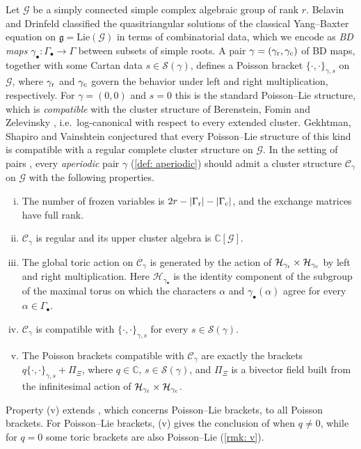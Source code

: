\documentclass[a4paper]{amsart}
\numberwithin{equation}{section}
\theoremstyle{definition}
\theoremstyle{remark}
\newcommand{\bbC}{\mathbb{C}}
\newcommand{\mfg}{\mathfrak{g}}
\newcommand{\mcG}{\mathcal{G}}
\newcommand{\mcH}{\mathcal{H}}
\newcommand{\mcC}{\mathcal{C}}
\newcommand{\mcS}{\mathcal{S}}
\newcommand{\rr}{{\rm r}}
\newcommand{\cc}{{\rm c}}
\newcommand{\toric}{\Pi}
\begin{document}
Let $\mcG$ be a simply connected simple complex algebraic group of rank $r$.
Belavin and Drinfeld \cite{BD82} classified the quasitriangular solutions of the classical Yang--Baxter equation on $\mfg=\mathrm{Lie}(\mcG)$ in terms of combinatorial data, which we encode as \emph{BD maps} $\gamma_\bullet:\Gamma_\bullet\to\Gamma$ between subsets of simple roots.
A pair $\gamma=(\gamma_{\rr},\gamma_{\cc})$ of BD maps, together with some Cartan data $s\in\mcS(\gamma)$, defines a Poisson bracket $\{\cdot,\cdot\}_{\gamma,s}$ on $\mcG$, where $\gamma_{\rr}$ and $\gamma_{\cc}$ govern the behavior under left and right multiplication, respectively.
For $\gamma=(0,0)$ and $s=0$ this is the standard Poisson--Lie structure, which is \emph{compatible} with the cluster structure of Berenstein, Fomin and Zelevinsky \cite{BFZ05}, i.e.\ log-canonical with respect to every extended cluster.
Gekhtman, Shapiro and Vainshtein conjectured \cite[Conjecture~3.2]{GSV11} that every Poisson--Lie structure of this kind is compatible with a regular complete cluster structure on $\mcG$.
In the setting of pairs \cite{GSV19}, every \emph{aperiodic} pair $\gamma$ (\cref{def: aperiodic}) should admit a cluster structure $\mcC_\gamma$ on $\mcG$ with the following properties.
\begin{enumerate}[(i)]
  \item The number of frozen variables is $2r-|\Gamma_{\rr}|-|\Gamma_{\cc}|$, and the exchange matrices have full rank.
  \item $\mcC_\gamma$ is regular and its upper cluster algebra is $\bbC[\mcG]$.
  \item The global toric action on $\mcC_\gamma$ is generated by the action of $\mcH_{\gamma_{\rr}}\times\mcH_{\gamma_{\cc}}$ by left and right multiplication.
  Here $\mcH_{\gamma_\bullet}$ is the identity component of the subgroup of the maximal torus on which the characters $\alpha$ and $\gamma_\bullet(\alpha)$ agree for every $\alpha\in\Gamma_\bullet$.
  \item $\mcC_\gamma$ is compatible with $\{\cdot,\cdot\}_{\gamma,s}$ for every $s\in\mcS(\gamma)$.
  \item The Poisson brackets compatible with $\mcC_\gamma$ are exactly the brackets $q\{\cdot,\cdot\}_{\gamma,s}+\toric_\Xi$, where $q\in\bbC$, $s\in\mcS(\gamma)$, and $\toric_\Xi$ is a bivector field built from the infinitesimal action of $\mcH_{\gamma_{\rr}}\times\mcH_{\gamma_{\cc}}$.
\end{enumerate}
Property (v) extends \cite[Conjecture~3.2(v)]{GSV11}, which concerns Poisson--Lie brackets, to all Poisson brackets. For Poisson--Lie brackets, (v) gives the conclusion of \cite[Conjecture~3.2(v)]{GSV11} when $q\neq0$, while for $q=0$ some toric brackets are also Poisson--Lie (\cref{rmk: v}).
\end{document}
